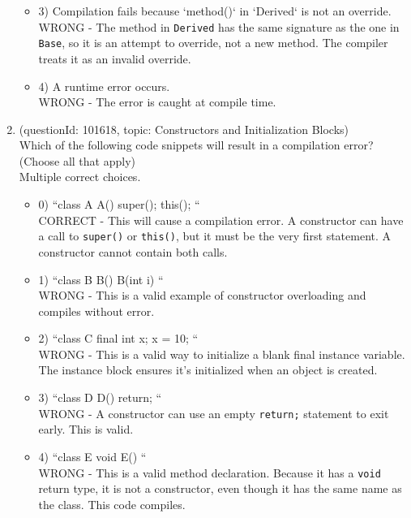 \documentclass[12pt]{article}
\begin{document}
\begin{enumerate}[label=(\arabic*)]
\begin{itemize}
\item 3) Compilation fails because `method()` in `Derived` is not an override.
 \\ 
WRONG - The method in \verb|Derived| has the same signature as the one in \verb|Base|, so it is an attempt to override, not a new method. The compiler treats it as an invalid override.

\item 4) A runtime error occurs.
 \\ 
WRONG - The error is caught at compile time.

\end{itemize}
\item (questionId: 101618, topic: Constructors and Initialization Blocks) \\ 
Which of the following code snippets will result in a compilation error? (Choose all that apply)
\\ \noindent Multiple correct choices. 
\begin{itemize}
\item 0) ``class A { A() { super(); this(); } }``
 \\ 
CORRECT - This will cause a compilation error. A constructor can have a call to \verb|super()| or \verb|this()|, but it must be the very first statement. A constructor cannot contain both calls.

\item 1) ``class B { B() { } B(int i) { } }``
 \\ 
WRONG - This is a valid example of constructor overloading and compiles without error.

\item 2) ``class C { final int x; { x = 10; } }``
 \\ 
WRONG - This is a valid way to initialize a blank final instance variable. The instance block ensures it's initialized when an object is created.

\item 3) ``class D { D() { return; } }``
 \\ 
WRONG - A constructor can use an empty \verb|return;| statement to exit early. This is valid.

\item 4) ``class E { void E() {} }``
 \\ 
WRONG - This is a valid method declaration. Because it has a \verb|void| return type, it is not a constructor, even though it has the same name as the class. This code compiles.


\end{itemize}
\end{enumerate}
\end{document}
